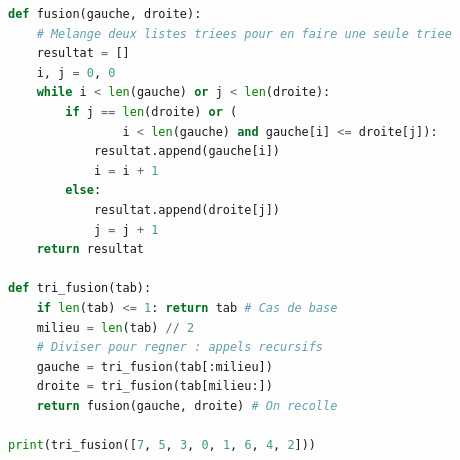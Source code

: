 \documentclass[12pt,a4paper]{report}
\begin{document}
\newpage
\begin{Comprendre}
\begin{lstlisting}[language=Python]
def fusion(gauche, droite):
    # Melange deux listes triees pour en faire une seule triee
    resultat = []
    i, j = 0, 0
    while i < len(gauche) or j < len(droite):
        if j == len(droite) or (
                i < len(gauche) and gauche[i] <= droite[j]):
            resultat.append(gauche[i])
            i = i + 1
        else:
            resultat.append(droite[j])
            j = j + 1
    return resultat

def tri_fusion(tab):
    if len(tab) <= 1: return tab # Cas de base
    milieu = len(tab) // 2
    # Diviser pour regner : appels recursifs
    gauche = tri_fusion(tab[:milieu]) 
    droite = tri_fusion(tab[milieu:])
    return fusion(gauche, droite) # On recolle

print(tri_fusion([7, 5, 3, 0, 1, 6, 4, 2]))  
\end{lstlisting}
\begin{center}
    
\end{center}
\end{Comprendre}
\end{document}
